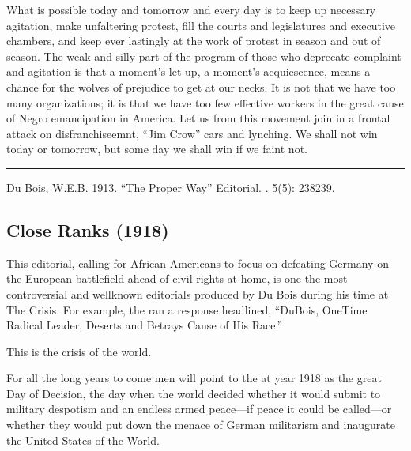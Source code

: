 \documentclass[letterpaper,10pt,english]{jupyterBook}
\begin{document}
\sphinxAtStartPar
What is possible to\sphinxhyphen{}day and tomorrow and every day is to keep up necessary agitation, make unfaltering protest, fill the courts and legislatures and executive chambers, and keep ever lastingly at the work of protest in season and out of season. The weak and silly part of the program of those who deprecate complaint and agitation is that a moment’s let up, a moment’s acquiescence, means a chance for the wolves of prejudice to get at our necks. It is not that we have too many organizations; it is that we have too few effective workers in the great cause of Negro emancipation in America. Let us from this movement join in a frontal attack on disfranchiseemnt, “Jim Crow” cars and lynching. We shall not win today or to\sphinxhyphen{}morrow, but some day we shall win if we faint not.


\bigskip\hrule\bigskip


\sphinxAtStartPar
{} Du Bois, W.E.B. 1913. “The Proper Way” Editorial. . 5(5): 238\sphinxhyphen{}239.


\subsection{Close Ranks (1918)}
\label{\detokenize{Volumes/16/03/close_ranks:close-ranks-1918}}\label{\detokenize{Volumes/16/03/close_ranks::doc}}
\begin{sphinxShadowBox}
\sphinxstylesidebartitle{}

\sphinxAtStartPar
This editorial, calling for African Americans to focus on defeating Germany on the European battlefield ahead of civil rights at home, is one the most controversial and well\sphinxhyphen{}known editorials produced by Du Bois during his time at The Crisis. For example, the  ran a response headlined, “DuBois, One\sphinxhyphen{}Time Radical Leader, Deserts and Betrays Cause of His Race.”
\end{sphinxShadowBox}

\sphinxAtStartPar
This is the crisis of the world.

\sphinxAtStartPar
For all the long years to come men will point to the at year 1918 as the great Day of Decision, the day when the world decided whether it would submit to military despotism and an endless armed peace—if peace it could be called—or whether they would put down the menace of German militarism and inaugurate the United States of the World.
\end{document}

